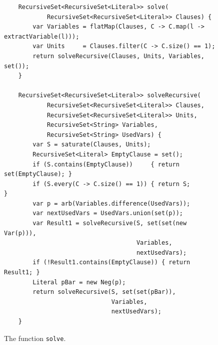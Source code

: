 \begin{figure}[!ht]
  \centering
\begin{verbatim}
    RecursiveSet<RecursiveSet<Literal>> solve(
            RecursiveSet<RecursiveSet<Literal>> Clauses) {
        var Variables = flatMap(Clauses, C -> C.map(l -> extractVariable(l)));
        var Units     = Clauses.filter(C -> C.size() == 1);
        return solveRecursive(Clauses, Units, Variables, set());
    }

    RecursiveSet<RecursiveSet<Literal>> solveRecursive(
            RecursiveSet<RecursiveSet<Literal>> Clauses,
            RecursiveSet<RecursiveSet<Literal>> Units,
            RecursiveSet<String> Variables,
            RecursiveSet<String> UsedVars) {
        var S = saturate(Clauses, Units);
        RecursiveSet<Literal> EmptyClause = set();
        if (S.contains(EmptyClause))     { return set(EmptyClause); }
        if (S.every(C -> C.size() == 1)) { return S;                }
        var p = arb(Variables.difference(UsedVars));
        var nextUsedVars = UsedVars.union(set(p));
        var Result1 = solveRecursive(S, set(set(new Var(p))),
                                     Variables,
                                     nextUsedVars);
        if (!Result1.contains(EmptyClause)) { return Result1; }
        Literal pBar = new Neg(p);
        return solveRecursive(S, set(set(pBar)),
                              Variables,
                              nextUsedVars);
    }
\end{verbatim}
\vspace*{-0.3cm}
  \caption{The function \texttt{solve}.}
  \label{fig:solve}
\end{figure}

